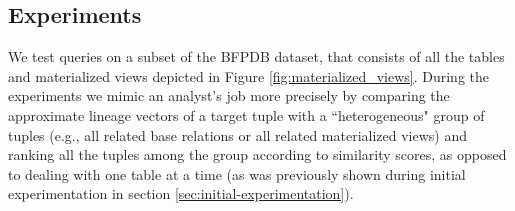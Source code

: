 
\subsection{Experiments}
\begin{runexperiment}
We test queries on a subset of the BFPDB dataset, that consists of all the tables and materialized views depicted in Figure \ref{fig:materialized_views}. During the experiments we mimic an analyst's job more precisely by comparing the approximate lineage vectors of a target tuple with a ``heterogeneous" group of tuples (e.g., all related base relations or all related materialized views) and ranking all the tuples among the group according to similarity scores, as opposed to dealing with one table at a time (as was previously shown during initial experimentation in section \ref{sec:initial-experimentation}).
\end{runexperiment}

